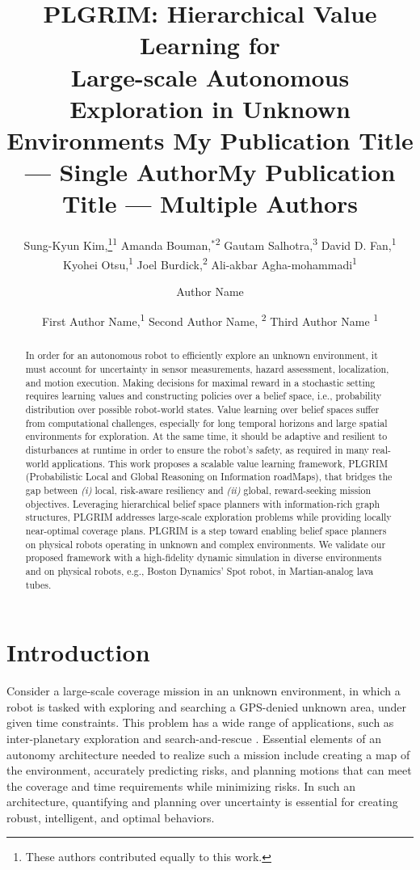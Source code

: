 \documentclass[letterpaper]{article} %
\title{
    PLGRIM: Hierarchical Value Learning for \\Large-scale Autonomous Exploration in Unknown Environments
}
\author{
		Sung-Kyun Kim,\thanks{These authors contributed equally to this work.}\textsuperscript{\rm 1}
    Amanda Bouman,$^{*}$\textsuperscript{\rm 2}
    Gautam Salhotra,\textsuperscript{\rm 3}
    David D. Fan,\textsuperscript{\rm 1} \\
    Kyohei Otsu,\textsuperscript{\rm 1}
    Joel Burdick,\textsuperscript{\rm 2}
    Ali-akbar Agha-mohammadi\textsuperscript{\rm 1} \\
}
\title{My Publication Title --- Single Author}
\author {
    Author Name \\
}
\title{My Publication Title --- Multiple Authors}
\author {
    First Author Name,\textsuperscript{\rm 1}
    Second Author Name, \textsuperscript{\rm 2}
    Third Author Name \textsuperscript{\rm 1} \\
}
\newcommand{\phdone}[1]{} %
\newcommand{\acomm}[1]{{\color{cyan}Ali:#1}} %
\begin{document}
\maketitle

\begin{abstract}
In order for an autonomous robot to efficiently explore an unknown environment, it must account for uncertainty in sensor measurements, hazard assessment, localization, and motion execution.
Making decisions for maximal reward in a stochastic setting requires learning values and constructing policies over a belief space, i.e., probability distribution over possible robot-world states.
Value learning over belief spaces suffer from computational challenges, especially for long temporal horizons and large spatial environments for exploration. %
At the same time, it should be adaptive and resilient to disturbances at runtime in order to ensure the robot's safety, as required in many real-world applications.
This work proposes a scalable value learning framework, PLGRIM (Probabilistic Local and Global Reasoning on Information roadMaps), that bridges the gap between \textit{(i)} local, risk-aware resiliency and \textit{(ii)} global, reward-seeking mission objectives.  
Leveraging hierarchical belief space planners with information-rich graph structures, PLGRIM addresses large-scale exploration problems while providing locally near-optimal coverage plans. 
PLGRIM is a step toward enabling belief space planners on physical robots operating in unknown and complex environments. 
We validate our proposed framework with a high-fidelity dynamic simulation in diverse environments and on physical robots, e.g., Boston Dynamics' Spot robot, in Martian-analog lava tubes.
\end{abstract}


\section{Introduction}\label{sec:intro}

\phdone{High-level mission}
Consider a large-scale coverage mission in an unknown environment, in which a robot is tasked with exploring and searching a GPS-denied unknown area, under given time constraints. This problem has a wide range of applications, such as inter-planetary exploration and search-and-rescue \cite{blank2020robotic,nagatani2013emergency}. %
Essential elements of an autonomy architecture needed to realize such a mission include creating a map of the environment, accurately predicting risks, and planning motions that can meet the coverage and time requirements while minimizing risks.  In such an architecture, quantifying and planning over uncertainty is essential for creating robust, intelligent, and optimal behaviors.
\end{document}
